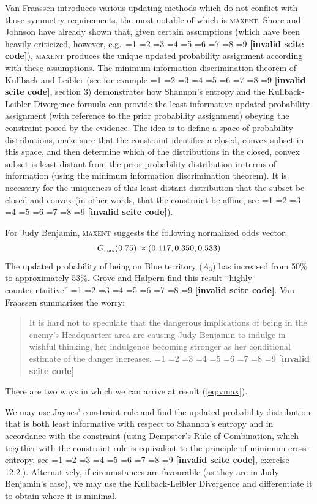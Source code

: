 \documentclass[smallextended]{svjour3}       %
\newcommand{\nias}{\noindent} %
\newcommand{\qeins}[1]{``#1''}
\newcommand{\PageP}{p.~}
\newcommand{\PageP}{}
\newcommand{\scite}[3]{\ifnum#1=1\cite{#2}\else
\ifnum#1=2\cite[{\PageP}~#3]{#2}\else
\ifnum#1=3\cite[{\PageP}~#3]{#2}\else
\ifnum#1=4\cite{#2}\else
\ifnum#1=5\cite{#2}\else
\ifnum#1=6\cite[{\PageP}~#3]{#2}\else
\ifnum#1=7\cite{#2}\else
\ifnum#1=8\cite[{\PageP}~#3]{#2}\else
\ifnum#1=9\cite[{\PageP}~#3]{#2}\else
\textbf{[invalid scite code]}\fi\fi\fi\fi\fi\fi\fi\fi\fi}
\newenvironment{quotex}{\begin{quote}\begin{footnotesize}}{\end{footnotesize}\end{quote}}
\begin{document}
Van Fraassen introduces various updating methods which do not conflict
with those symmetry requirements, the most notable of which is
\textsc{maxent}. Shore and Johnson have already shown that, given
certain assumptions (which have been heavily criticized, however,
e.g.\ \scite{7}{uffink96}{}), \textsc{maxent} produces the unique
updated probability assignment according with these assumptions. The
minimum information discrimination theorem of Kullback and Leibler
(see for example \scite{7}{csiszar67}{}, section 3) demonstrates how
Shannon's entropy and the Kullback-Leibler Divergence formula can
provide the least informative updated probability assignment (with
reference to the prior probability assignment) obeying the constraint
posed by the evidence. The idea is to define a space of probability
distributions, make sure that the constraint identifies a closed,
convex subset in this space, and then determine which of the
distributions in the closed, convex subset is least distant from the
prior probability distribution in terms of information (using the
minimum information discrimination theorem). It is necessary for the
uniqueness of this least distant distribution that the subset be
closed and convex (in other words, that the constraint be affine, see
\scite{7}{csiszar67}{}).

For Judy Benjamin, \textsc{maxent} suggests the following normalized
odds vector:
\begin{equation}
  \label{eq:vmax}
  G_{\mbox{{\tiny max}}}(0.75)\approx(0.117,0.350,0.533)
\end{equation}
The updated probability of being on Blue territory ($A_{3}$) has
increased from 50\% to approximately 53\%. Grove and Halpern find this
result \qeins{highly counterintuitive} \scite{2}{grovehalpern97}{2}.
Van Fraassen summarizes the worry:
\begin{quotex}
  It is hard not to speculate that the dangerous implications of being
  in the enemy's Headquarters area are causing Judy Benjamin to
  indulge in wishful thinking, her indulgence becoming stronger as her
  conditional estimate of the danger increases. \scite{3}{fraassen81}{379}
\end{quotex}

\bigskip

\nias There are two ways in which we can arrive at result
({\ref{eq:vmax}}).

We may use Jaynes' constraint rule and find the updated probability
distribution that is both least informative with respect to Shannon's
entropy and in accordance with the constraint (using Dempster's Rule
of Combination, which together with the constraint rule is equivalent
to the principle of minimum cross-entropy, see
\scite{8}{coverthomas06}{409}, exercise 12.2.). Alternatively, if
circumstances are favourable (as they are in Judy Benjamin's case), we
may use the Kullback-Leibler Divergence and differentiate it to obtain
where it is minimal.
\end{document}
